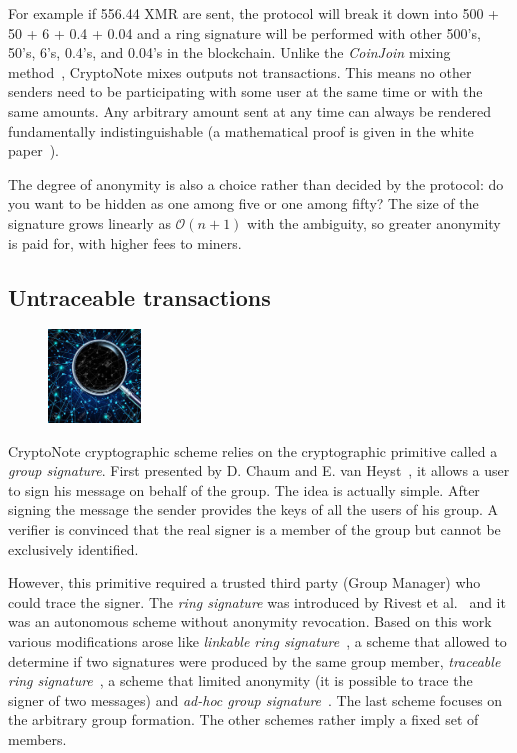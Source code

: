 For example if 556.44 XMR are sent, the protocol will break it down into 500 + 50 + 6 + 0.4 + 0.04 and a ring signature will be performed with other 500's, 50's, 6's, 0.4's, and 0.04's in the blockchain. Unlike the \emph{CoinJoin} mixing method~\cite{btcforum}, CryptoNote mixes outputs not transactions. This means no other senders need to be participating with some user at the same time or with the same amounts. Any arbitrary amount sent at any time can always be rendered fundamentally indistinguishable (a mathematical proof is given in the white paper~\cite{citeulike:14139412}).

The degree of anonymity is also a choice rather than decided by the protocol: do you want to be hidden as one among five or one among fifty? The size of the signature grows linearly as $\mathcal{O}(n+1)$ with the ambiguity, so greater anonymity is paid for, with higher fees to miners.

\subsection{Untraceable transactions} \label{sec:untraceable}
\begin{figure}
\centering
\includegraphics[width=0.22\textwidth]{Images/CryptoNote/untraceable.jpg}
\end{figure}
CryptoNote cryptographic scheme relies on the cryptographic primitive called a \emph{group signature}. First presented by D. Chaum and E. van Heyst~\cite{group}, it allows a user to sign his message on behalf of the group. The idea is actually simple. After signing the message the sender provides the keys of all the users of his group. A verifier is convinced that the real signer is a member of the group but cannot be exclusively identified.

However, this primitive required a trusted third party (Group Manager) who could trace the signer. The \emph{ring signature} was introduced by Rivest et al.~\cite{ring} and it was an autonomous scheme without anonymity revocation. Based on this work various modifications arose like \emph{linkable ring signature}~\cite{link1,link2,short}, a scheme that allowed to determine if two signatures were produced by the same group member, \emph{traceable ring signature}~\cite{traceable1,traceable2}, a scheme that limited anonymity (it is possible to trace the signer of two messages) and \emph{ad-hoc group signature}~\cite{ad-hoc1,ad-hoc2}. The last scheme focuses on the arbitrary group formation. The other schemes rather imply a fixed set of members.

